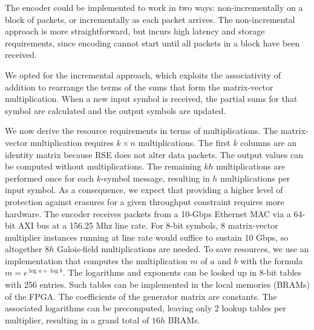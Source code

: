 The encoder could be implemented to work in two ways:
non-incrementally on a block of packets, or incrementally as each
packet arrives. The non-incremental approach is more straightforward,
but incurs high latency and storage requirements, since  encoding
cannot start until all packets in a block have been received.

We opted for the incremental approach, which exploits the associativity of addition to
rearrange the terms of the sums that form the matrix-vector multiplication.
When a new input symbol is received, the partial sums for that symbol are
calculated and the output symbols are updated.

We now derive the resource requirements in terms of multiplications.
The matrix-vector multiplication requires $k \times n$
multiplications. %
The first $k$ columns are an identity matrix because RSE does not alter data
packets.  The output values can be computed without multiplications.  The
remaining $kh$ multiplications are performed once for each $k$-symbol message,
resulting in $h$ multiplications per input symbol.  As a consequence, we expect that
providing a higher level of protection against erasures for a given throughput
constraint requires more hardware.  The encoder receives
packets from a 10-Gbps Ethernet MAC via a 64-bit AXI bus at a 156.25 Mhz line
rate.  For 8-bit symbols, 8 matrix-vector multiplier instances running at
line rate would suffice to sustain 10 Gbps, so altogether $8h$ Galois-field multiplications
are needed.  To save resources, we use an implementation that computes the
multiplication $m$ of $a$ and $b$ with the formula $m = e^{\log a + \log b}$.
The logarithms and exponents can be looked up in 8-bit tables with 256
entries.
Such tables can be implemented in the local memories (BRAMs) of the FPGA.  
The coefficients of the generator matrix are constants.  The associated
logarithms can be precomputed, leaving only 2 lookup tables per multiplier,
resulting in a grand total of $16h$ BRAMs.

